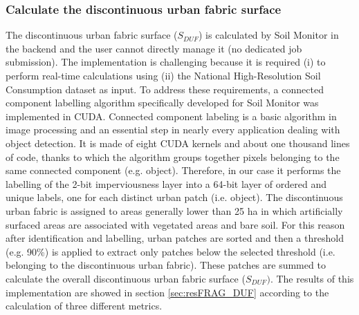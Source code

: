 \documentclass[APA,LATO1COL,doublespace]{WileyNJD-v2}
\newcommand{\toberevised}[1]{\emph{\textcolor{red}{#1}}} %
\begin{document}
\subsubsection{ Calculate the discontinuous urban fabric surface }
\label{sec:mmDUF}
The discontinuous urban fabric surface ($S_{DUF}$) is calculated by Soil Monitor in the backend and the user cannot directly manage it (no dedicated job submission). %
The implementation is challenging because it is required (i) to perform real-time calculations using (ii) the National High-Resolution Soil Consumption dataset as input.
To address these requirements, a connected component labelling algorithm specifically developed for Soil Monitor was implemented in CUDA.
Connected component labeling is a basic algorithm in image processing and an essential step in nearly every application dealing with object detection.
It is made of eight CUDA kernels and about one thousand lines of code, thanks to which the algorithm groups together pixels belonging to the same connected component (e.g. object).
Therefore, in our case it performs the labelling of the 2-bit imperviousness layer into a 64-bit layer of ordered and unique labels, one for each distinct urban patch (i.e. object).
The discontinuous urban fabric is assigned to areas generally lower than 25 ha in which artificially surfaced areas are associated with vegetated areas and bare soil.
For this reason after identification and labelling, urban patches are sorted and then a threshold (e.g. 90\%) is applied to extract only patches below the selected threshold (i.e. belonging to the discontinuous urban fabric). %
These patches are summed to calculate the overall discontinuous urban fabric surface ($S_{DUF})$.
The results of this implementation are showed in section \ref{sec:resFRAG_DUF} according to the calculation of three different metrics.
\end{document}
